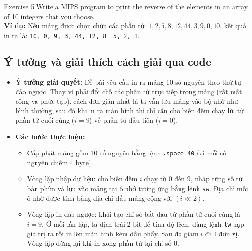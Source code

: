 \documentclass[a4paper]{article}
\numberwithin{figure}{section}
\numberwithin{table}{section}
\begin{document}
\begin{problembox}{Exercise 5}
Write a MIPS program to print the reverse of the elements in an array of 10 integers that you choose.\\
\textbf{Ví dụ:} Nếu mảng được chọn chứa các phần tử: $1, 2, 5, 8, 12, 44, 3, 9, 0, 10$, kết quả in ra là: \texttt{10, 0, 9, 3, 44, 12, 8, 5, 2, 1}.
\end{problembox}

\subsection{Ý tưởng và giải thích cách giải qua code}
\begin{itemize}[leftmargin=*]
    \item \textbf{Ý tưởng giải quyết:}
    Đề bài yêu cầu in ra mảng 10 số nguyên theo thứ tự đảo ngược. Thay vì phải đổi chỗ các phần tử trực tiếp trong mảng (rất mất công và phức tạp), cách đơn giản nhất là ta vẫn lưu mảng vào bộ nhớ như bình thường, sau đó khi in ra màn hình thì chỉ cần cho biến đếm chạy lùi từ phần tử cuối cùng ($i = 9$) về phần tử đầu tiên ($i = 0$).
    
    \item \textbf{Các bước thực hiện:}
    \begin{itemize}[leftmargin=*]
        \item Cấp phát mảng gồm 10 số nguyên bằng lệnh \texttt{.space 40} (vì mỗi số nguyên chiếm 4 byte).
        \item Vòng lặp nhập dữ liệu: cho biến đếm $i$ chạy từ 0 đến 9, nhập từng số từ bàn phím và lưu vào mảng tại ô nhớ tương ứng bằng lệnh \texttt{sw}. Địa chỉ mỗi ô nhớ được tính bằng địa chỉ đầu mảng cộng với $(i \ll 2)$.
        \item Vòng lặp in đảo ngược: khởi tạo chỉ số bắt đầu từ phần tử cuối cùng là $i = 9$. Ở mỗi lần lặp, ta dịch trái 2 bit để tính độ lệch, dùng lệnh \texttt{lw} nạp giá trị ra rồi in lên màn hình kèm dấu phẩy. Sau đó giảm $i$ đi 1 đơn vị. Vòng lặp dừng lại khi in xong phần tử tại chỉ số 0.
    \end{itemize}
\end{itemize}
\end{document}
